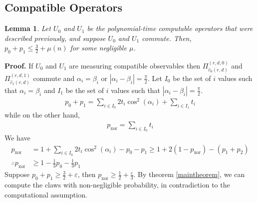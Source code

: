 \documentclass{article}
\newtheorem{lem}[thm]{Lemma}
\begin{document}
\subsection{Compatible Operators}
\begin{lem}
\label{compatible}
Let $U_{0}$ and $U_{1}$ be the polynomial-time computable operators that were described previously, and suppose $U_{0}$ and $U_{1}$ commute. Then, $p_{0}+p_{1} \leq \frac{3}{2}+\mu(n)$ for some negligible $\mu$.
\end{lem} \textbf{Proof.} If $U_{0}$ and $U_{1}$ are measuring compatible observables then $\Pi_{\hat{c}_{0}(r,d)}^{(r,d,0)}$ and $\Pi_{\hat{c}_{1}(r,d)}^{(r,d,1)}$ commute and $\alpha_{i}=\beta_{i}$ or $|\alpha_{i}-\beta_{i}|=\frac{\pi}{2}$. Let $I_{0}$ be the set of $i$ values such that $\alpha_{i}=\beta_{i}$ and $I_{1}$ be the set of $i$ values such that $|\alpha_{i}-\beta_{i}|=\frac{\pi}{2}$. \begin{align}
    p_{0} + p_{1} = \sum_{i\in I_{0}}{2t_{i}\cos^{2}(\alpha_{i})} + \sum_{i\in I_{1}}t_{i}
\end{align}
while on the other hand,
\begin{align}
    p_{\mathrm{xor}} = \sum_{i\in I_{0}}t_{i} 
\end{align}
We have \begin{align}
    p_{\mathrm{xor}} &= 1 + \sum_{i\in I_{0}}{2t_{i}\cos^{2}(\alpha_{i})} - p_{0} - p_{1} \geq 1+2(1-p_{\mathrm{xor}})-(p_{1}+p_{2})\\
    \therefore p_{\mathrm{xor}} &\geq 1 - \frac{1}{3}p_{0}-\frac{1}{3}p_{1}
\end{align}
Suppose $p_{0}+p_{1} \geq \frac{3}{2} + \varepsilon$, then $p_{\mathrm{xor}}\geq \frac{1}{2}+\frac{\varepsilon}{3}$. By theorem \ref{maintheorem}, we can compute the claws with non-negligible probability, in contradiction to the computational assumption.
\end{document}
